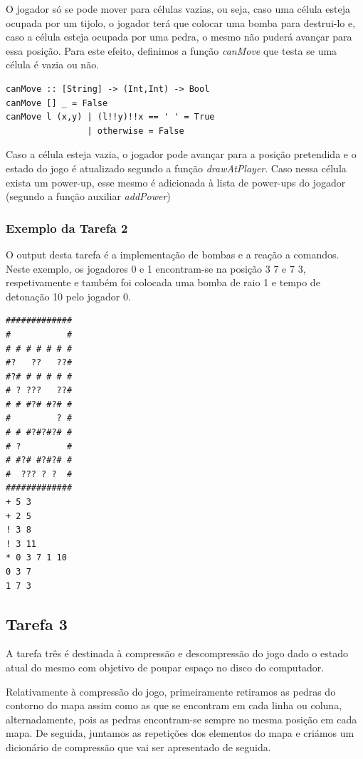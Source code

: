 \documentclass[a4paper]{article}
\begin{document}
\vspace{0.5cm}

O jogador só se pode mover para células vazias, ou seja, caso uma célula esteja ocupada por um tijolo, o jogador terá que colocar uma bomba para destrui-lo e, caso a célula esteja ocupada por uma pedra, o mesmo não puderá avançar para essa posição. Para este efeito, definimos a função \emph{canMove} que testa se uma célula é vazia ou não.

\begin{verbatim}
canMove :: [String] -> (Int,Int) -> Bool
canMove [] _ = False
canMove l (x,y) | (l!!y)!!x == ' ' = True
                | otherwise = False
\end{verbatim}

Caso a célula esteja vazia, o jogador pode avançar para a posição pretendida e o estado do jogo é atualizado segundo a função \emph{drawAtPlayer}. Caso nessa célula exista um power-up, esse mesmo é adicionada à lista de power-ups do jogador (segundo a função auxiliar \emph{addPower})

\vspace{0.5cm}

\subsubsection{Exemplo da Tarefa 2}
O output desta tarefa é a implementação de bombas e a reação a comandos. Neste exemplo, os jogadores 0 e 1 encontram-se na posição 3 7 e 7 3, respetivamente e também foi colocada uma bomba de raio 1 e tempo de detonação 10 pelo jogador 0.

\begin{verbatim}
#############
#           #
# # # # # # #
#?   ??   ??#
#?# # # # # #
# ? ???   ??#
# # #?# #?# #
#         ? #
# # #?#?#?# #
# ?         #
# #?# #?#?# #
#  ??? ? ?  #
#############
+ 5 3
+ 2 5
! 3 8
! 3 11
* 0 3 7 1 10
0 3 7
1 7 3
\end{verbatim}

\subsection{Tarefa 3} A tarefa três é destinada à compressão e descompressão do jogo dado o estado atual do mesmo com objetivo de poupar espaço no disco do computador.\par Relativamente à compressão do jogo, primeiramente retiramos as pedras do contorno do mapa assim como as que se encontram em cada linha ou coluna, alternadamente, pois as pedras encontram-se sempre no mesma posição em cada mapa. De seguida, juntamos as repetições dos elementos do mapa e criámos um dicionário de compressão que vai ser apresentado de seguida.
\end{document}
